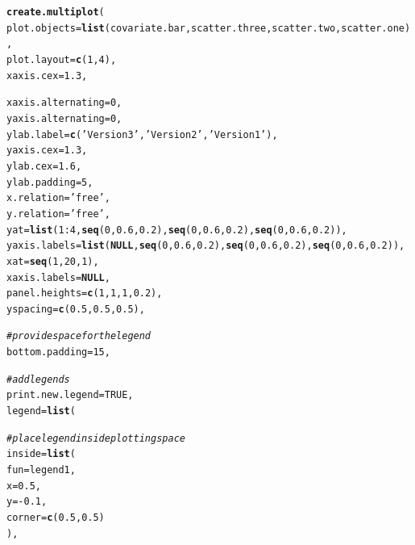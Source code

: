 \documentclass[letterpaper]{article}\usepackage[]{graphicx}\usepackage[]{color}
\makeatletter
\newcommand{\hlnum}[1]{\textcolor[rgb]{0.686,0.059,0.569}{#1}}%
\newcommand{\hlstr}[1]{\textcolor[rgb]{0.192,0.494,0.8}{#1}}%
\newcommand{\hlcom}[1]{\textcolor[rgb]{0.678,0.584,0.686}{\textit{#1}}}%
\newcommand{\hlopt}[1]{\textcolor[rgb]{0,0,0}{#1}}%
\newcommand{\hlstd}[1]{\textcolor[rgb]{0.345,0.345,0.345}{#1}}%
\newcommand{\hlkwa}[1]{\textcolor[rgb]{0.161,0.373,0.58}{\textbf{#1}}}%
\newcommand{\hlkwc}[1]{\textcolor[rgb]{0.333,0.667,0.333}{#1}}%
\newcommand{\hlkwd}[1]{\textcolor[rgb]{0.737,0.353,0.396}{\textbf{#1}}}%
\newenvironment{kframe}{%
 \def\at@end@of@kframe{}%
 \ifinner\ifhmode%
  \def\at@end@of@kframe{\end{minipage}}%
  \begin{minipage}{\columnwidth}%
 \fi\fi%
 \def\FrameCommand##1{\hskip\@totalleftmargin \hskip-\fboxsep
 \colorbox{shadecolor}{##1}\hskip-\fboxsep
     \hskip-\linewidth \hskip-\@totalleftmargin \hskip\columnwidth}%
 \MakeFramed {\advance\hsize-\width
   \@totalleftmargin\z@ \linewidth\hsize
   \@setminipage}}%
 {\par\unskip\endMakeFramed%
 \at@end@of@kframe}
\newenvironment{knitrout}{}{} %
\makeatother
\begin{document}
\begin{knitrout}
\color{fgcolor}\begin{kframe}
\begin{alltt}
\hlkwd{create.multiplot}\hlstd{(}
    \hlkwc{plot.objects} \hlstd{=} \hlkwd{list}\hlstd{(covariate.bar, scatter.three, scatter.two, scatter.one),}
    \hlkwc{plot.layout} \hlstd{=} \hlkwd{c}\hlstd{(}\hlnum{1}\hlstd{,}\hlnum{4}\hlstd{),}
    \hlkwc{xaxis.cex} \hlstd{=} \hlnum{1.3}\hlstd{,}

    \hlkwc{xaxis.alternating} \hlstd{=} \hlnum{0}\hlstd{,}
    \hlkwc{yaxis.alternating} \hlstd{=} \hlnum{0}\hlstd{,}
    \hlkwc{ylab.label} \hlstd{=} \hlkwd{c}\hlstd{(}\hlstr{'Version 3'}\hlstd{,} \hlstr{'Version 2'}\hlstd{,} \hlstr{'Version 1'}\hlstd{),}
    \hlkwc{yaxis.cex} \hlstd{=} \hlnum{1.3}\hlstd{,}
    \hlkwc{ylab.cex} \hlstd{=} \hlnum{1.6}\hlstd{,}
    \hlkwc{ylab.padding} \hlstd{=} \hlnum{5}\hlstd{,}
    \hlkwc{x.relation} \hlstd{=} \hlstr{'free'}\hlstd{,}
    \hlkwc{y.relation} \hlstd{=} \hlstr{'free'}\hlstd{,}
    \hlkwc{yat} \hlstd{=} \hlkwd{list}\hlstd{(}\hlnum{1}\hlopt{:}\hlnum{4}\hlstd{,} \hlkwd{seq}\hlstd{(}\hlnum{0}\hlstd{,} \hlnum{0.6}\hlstd{,} \hlnum{0.2}\hlstd{),} \hlkwd{seq}\hlstd{(}\hlnum{0}\hlstd{,} \hlnum{0.6}\hlstd{,} \hlnum{0.2}\hlstd{),} \hlkwd{seq}\hlstd{(}\hlnum{0}\hlstd{,} \hlnum{0.6}\hlstd{,} \hlnum{0.2}\hlstd{)),}
    \hlkwc{yaxis.labels} \hlstd{=} \hlkwd{list}\hlstd{(}\hlkwa{NULL}\hlstd{,} \hlkwd{seq}\hlstd{(}\hlnum{0}\hlstd{,} \hlnum{0.6}\hlstd{,} \hlnum{0.2}\hlstd{),} \hlkwd{seq}\hlstd{(}\hlnum{0}\hlstd{,} \hlnum{0.6}\hlstd{,} \hlnum{0.2}\hlstd{),} \hlkwd{seq}\hlstd{(}\hlnum{0}\hlstd{,} \hlnum{0.6}\hlstd{,} \hlnum{0.2}\hlstd{)),}
    \hlkwc{xat} \hlstd{=} \hlkwd{seq}\hlstd{(}\hlnum{1}\hlstd{,} \hlnum{20}\hlstd{,} \hlnum{1}\hlstd{),}
    \hlkwc{xaxis.labels} \hlstd{=} \hlkwa{NULL}\hlstd{,}
    \hlkwc{panel.heights} \hlstd{=} \hlkwd{c}\hlstd{(}\hlnum{1}\hlstd{,} \hlnum{1}\hlstd{,} \hlnum{1}\hlstd{,} \hlnum{0.2}\hlstd{),}
    \hlkwc{yspacing} \hlstd{=} \hlkwd{c}\hlstd{(}\hlnum{0.5}\hlstd{,} \hlnum{0.5}\hlstd{,} \hlnum{0.5}\hlstd{),}

    \hlcom{# provide space for the legend}
    \hlkwc{bottom.padding} \hlstd{=} \hlnum{15}\hlstd{,}

    \hlcom{# add legends}
    \hlkwc{print.new.legend} \hlstd{=} \hlnum{TRUE}\hlstd{,}
    \hlkwc{legend} \hlstd{=} \hlkwd{list}\hlstd{(}

        \hlcom{# place legend inside plotting space}
        \hlkwc{inside} \hlstd{=} \hlkwd{list}\hlstd{(}
            \hlkwc{fun} \hlstd{= legend1,}
            \hlkwc{x} \hlstd{=} \hlnum{0.5}\hlstd{,}
            \hlkwc{y} \hlstd{=} \hlopt{-}\hlnum{0.1}\hlstd{,}
            \hlkwc{corner} \hlstd{=} \hlkwd{c}\hlstd{(}\hlnum{0.5}\hlstd{,} \hlnum{0.5}\hlstd{)}
            \hlstd{),}


\end{alltt}
\end{kframe}
\end{knitrout}
\end{document}
